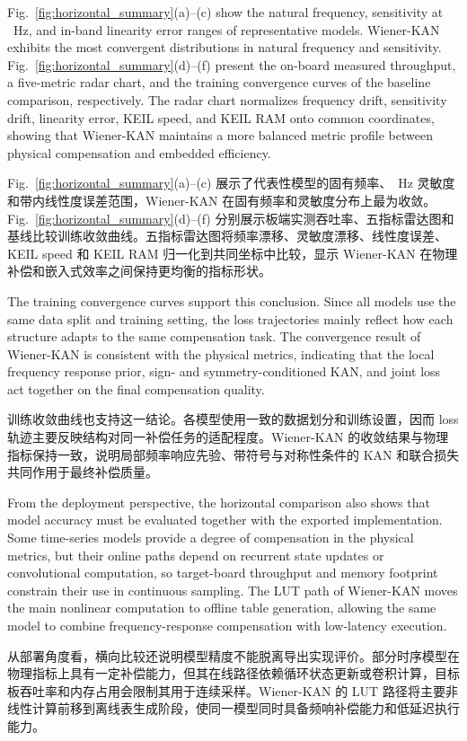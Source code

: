 \documentclass[sn-nature]{sn-jnl}
\newif\ifCNENEnglish
\newif\ifCNENBilingual
\newcommand{\CNEN}[2]{%
    \ifCNENBilingual
        #1%
        \if\relax\detokenize{#2}\relax\else\par #2\fi%
    \else
        \ifCNENEnglish
            #2%
        \else
            #1%
        \fi
    \fi
}
\begin{document}
\CNEN{Fig.~\ref{fig:horizontal_summary}(a)--(c) 展示了代表性模型的固有频率、\valSensitivityCompareFreq~Hz 灵敏度和带内线性度误差范围，Wiener-KAN 在固有频率和灵敏度分布上最为收敛。Fig.~\ref{fig:horizontal_summary}(d)--(f) 分别展示板端实测吞吐率、五指标雷达图和基线比较训练收敛曲线。五指标雷达图将频率漂移、灵敏度漂移、线性度误差、KEIL speed 和 KEIL RAM 归一化到共同坐标中比较，显示 Wiener-KAN 在物理补偿和嵌入式效率之间保持更均衡的指标形状。}{Fig.~\ref{fig:horizontal_summary}(a)--(c) show the natural frequency, sensitivity at \valSensitivityCompareFreq~Hz, and in-band linearity error ranges of representative models. Wiener-KAN exhibits the most convergent distributions in natural frequency and sensitivity. Fig.~\ref{fig:horizontal_summary}(d)--(f) present the on-board measured throughput, a five-metric radar chart, and the training convergence curves of the baseline comparison, respectively. The radar chart normalizes frequency drift, sensitivity drift, linearity error, KEIL speed, and KEIL RAM onto common coordinates, showing that Wiener-KAN maintains a more balanced metric profile between physical compensation and embedded efficiency.%
}

\CNEN{训练收敛曲线也支持这一结论。各模型使用一致的数据划分和训练设置，因而 loss 轨迹主要反映结构对同一补偿任务的适配程度。Wiener-KAN 的收敛结果与物理指标保持一致，说明局部频率响应先验、带符号与对称性条件的 KAN 和联合损失共同作用于最终补偿质量。}{The training convergence curves support this conclusion. Since all models use the same data split and training setting, the loss trajectories mainly reflect how each structure adapts to the same compensation task. The convergence result of Wiener-KAN is consistent with the physical metrics, indicating that the local frequency response prior, sign- and symmetry-conditioned KAN, and joint loss act together on the final compensation quality.}

\CNEN{从部署角度看，横向比较还说明模型精度不能脱离导出实现评价。部分时序模型在物理指标上具有一定补偿能力，但其在线路径依赖循环状态更新或卷积计算，目标板吞吐率和内存占用会限制其用于连续采样。Wiener-KAN 的 LUT 路径将主要非线性计算前移到离线表生成阶段，使同一模型同时具备频响补偿能力和低延迟执行能力。}{From the deployment perspective, the horizontal comparison also shows that model accuracy must be evaluated together with the exported implementation. Some time-series models provide a degree of compensation in the physical metrics, but their online paths depend on recurrent state updates or convolutional computation, so target-board throughput and memory footprint constrain their use in continuous sampling. The LUT path of Wiener-KAN moves the main nonlinear computation to offline table generation, allowing the same model to combine frequency-response compensation with low-latency execution.}
\end{document}
